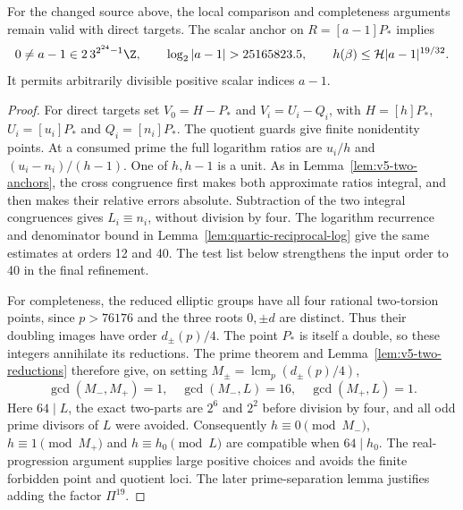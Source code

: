 \begin{lemma}\label{lem:v9-bridge}
For the changed source above, the local comparison and completeness
arguments remain valid with direct targets. The scalar anchor on
$R=[a-1]P_*$ implies
\[
 0\ne a-1\in2\,3^{2^{24}-1}\Z,
 \qquad \log_2|a-1|>25165823.5,
 \qquad h(\beta)\le\mathcal H|a-1|^{19/32}.
\]
It permits arbitrarily divisible positive scalar indices $a-1$.
\end{lemma}
\begin{proof}
For direct targets set $V_0=H-P_*$ and $V_i=U_i-Q_i$, with
$H=[h]P_*$, $U_i=[u_i]P_*$ and $Q_i=[n_i]P_*$. The quotient guards
give finite nonidentity points. At a consumed prime the full logarithm
ratios are $u_i/h$ and $(u_i-n_i)/(h-1)$. One of $h,h-1$ is a unit.
As in Lemma~\ref{lem:v5-two-anchors}, the cross congruence first makes
both approximate ratios integral, and then makes their relative
errors absolute. Subtraction of the two integral congruences gives
$L_i\equiv n_i$, without division by four. The logarithm recurrence
and denominator bound in Lemma~\ref{lem:quartic-reciprocal-log} give
the same estimates at orders 12 and 40. The test list below strengthens
the input order to 40 in the final refinement.

For completeness, the reduced elliptic groups have all four rational
two-torsion points, since $p>76176$ and the three roots $0,\pm d$
are distinct. Thus their doubling images have order $d_\pm(p)/4$.
The point $P_*$ is itself a double, so these integers annihilate its
reductions. The prime theorem and Lemma~\ref{lem:v5-two-reductions}
therefore give, on setting $M_\pm=\operatorname{lcm}_p(d_\pm(p)/4)$,
\[
 \gcd(M_-,M_+)=1,\quad\gcd(M_-,L)=16,\quad\gcd(M_+,L)=1.
\]
Here $64\mid L$, the exact two-parts are $2^6$ and $2^2$ before
division by four, and all odd prime divisors of $L$ were avoided.
Consequently $h\equiv0\pmod{M_-}$, $h\equiv1\pmod{M_+}$ and
$h\equiv h_0\pmod L$ are compatible when $64\mid h_0$.
The real-progression argument supplies large positive choices and
avoids the finite forbidden point and quotient loci. The later
prime-separation lemma justifies adding the factor $\Pi^{19}$.


\end{proof}
